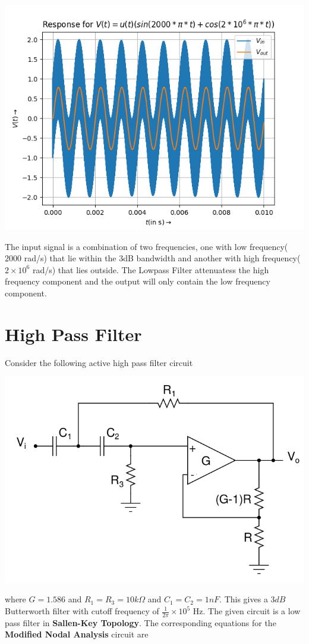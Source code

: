 \documentclass[12pt, a4paper]{report}
\begin{document}
\begin{center}
	\includegraphics[scale=0.72]{Figure_3png.png} 
	\label{fig:rawdata}
\end{center}

The input signal is a combination of two frequencies, one with low frequency($2000$ rad/s) that lie within the 3dB bandwidth and another with high frequency($2 \times 10^6$ rad/s) that lies outside. The Lowpass Filter attenuatess the high frequency component and the output will only contain the low frequency component.

\section*{High Pass Filter}
Consider the following active high pass filter circuit
\begin{center}
	\includegraphics[scale=0.5]{FigureX.png} 
	\label{fig:rawdata}
\end{center}
where $G = 1.586$ and $R_1 = R_3 = 10k\Omega$ and $C_1 = C_2 = 1nF$. This gives a $3dB$ Butterworth filter with cutoff frequency of $\frac{1}{2\pi} \times 10^5$ Hz. The given circuit is a low pass filter in \textbf{Sallen-Key Topology}. The corresponding equations for the \textbf{Modified Nodal Analysis} circuit are
\end{document}
